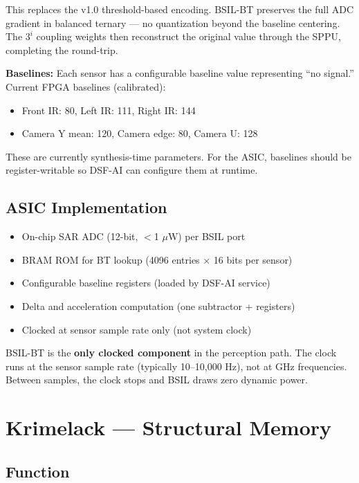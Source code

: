 \documentclass[11pt, a4paper]{article}
\begin{document}
This replaces the v1.0 threshold-based encoding. BSIL-BT preserves
the full ADC gradient in balanced ternary --- no quantization beyond
the baseline centering. The $3^i$ coupling weights then reconstruct
the original value through the SPPU, completing the round-trip.

\textbf{Baselines:} Each sensor has a configurable baseline value
representing ``no signal.'' Current FPGA baselines (calibrated):
\begin{itemize}[nosep]
  \item Front IR: 80, Left IR: 111, Right IR: 144
  \item Camera Y mean: 120, Camera edge: 80, Camera U: 128
\end{itemize}

These are currently synthesis-time parameters. For the ASIC, baselines
should be register-writable so DSF-AI can configure them at runtime.

\subsection{ASIC Implementation}

\begin{itemize}[nosep]
  \item On-chip SAR ADC (12-bit, $<$1 $\mu$W) per BSIL port
  \item BRAM ROM for BT lookup (4096 entries $\times$ 16 bits per sensor)
  \item Configurable baseline registers (loaded by DSF-AI service)
  \item Delta and acceleration computation (one subtractor + registers)
  \item Clocked at sensor sample rate only (not system clock)
\end{itemize}

BSIL-BT is the \textbf{only clocked component} in the perception path.
The clock runs at the sensor sample rate (typically 10--10,000 Hz),
not at GHz frequencies. Between samples, the clock stops and BSIL
draws zero dynamic power.

\section{Krimelack — Structural Memory}

\subsection{Function}
\end{document}
